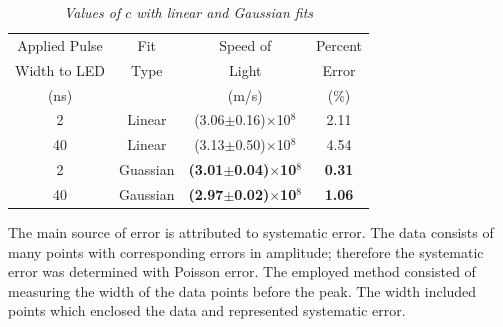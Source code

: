\documentclass[aps,prl,twocolumn,superscriptaddress,nofootinbib]{revtex4-1}
\begin{document}
\begin{table}[h!] 
\caption{\it Values of $c$ with linear and Gaussian fits}
\label{t1}   %
 \begin{center}   %
    \begin{tabular}{|c|c|c|c|} \hline   %

Applied Pulse & Fit & Speed of & Percent \\
Width to LED & Type & Light & Error \\
(ns)  &  & (m/s) &  (\%)  \\ \hline \hline \hline
2 & Linear & (3.06$\pm$0.16)$\times$10$^8$ & 2.11 \\ \hline
40 & Linear  & (3.13$\pm$0.50)$\times$10$^8$ & 4.54 \\ \hline \hline
2 & Guassian & \textbf{(3.01$\pm$0.04)$\times$10$^8$}& \textbf{0.31} \\ \hline
40 & Gaussian  & \textbf{(2.97$\pm$0.02)$\times$10$^8$} & \textbf{1.06} \\ \hline

     \end{tabular}
  \end{center}
\end{table}

\vfill\eject
\indent The main source of error is attributed to systematic error. The data consists of many points with corresponding errors in amplitude; therefore the systematic error was determined with Poisson error. The employed method consisted of measuring the width of the data points before the peak. The width included points which enclosed the data and represented systematic error.
\end{document}
